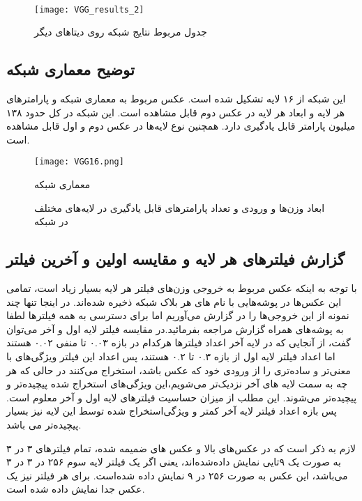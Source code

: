 \documentclass{article}
\begin{document}
‌\begin{figure}[H]
	\centerline{\texttt{[image: VGG\_results\_2]}}
	\caption{جدول مربوط نتایج شبکه  روی دیتاهای دیگر}
\end{figure}
\subsection{توضیح معماری شبکه }
این شبکه از ۱۶ لایه تشکیل شده است. عکس مربوط به معماری شبکه و پارامتر‌های هر لایه و ابعاد هر لایه در عکس دوم قابل مشاهده است. این شبکه در کل حدود ۱۳۸ میلیون 
پارامتر قابل یادگیری دارد. همچنین نوع لایه‌ها در عکس دوم و اول قابل مشاهده است.
\begin{figure}[H]
	\centerline{\texttt{[image: VGG16.png]}}
	\caption{معماری شبکه }
\end{figure}
\begin{figure}[H]
	\centering
	\caption {ابعاد وزن‌ها و ورودی و تعداد پارامتر‌های قابل یادگیری در لایه‌های مختلف در شبکه }
\end{figure}
\subsection{گزارش فیلتر‌های هر لایه و مقایسه اولین و آخرین فیلتر}
با توجه به اینکه عکس مربوط به خروجی وزن‌های فیلتر هر لایه بسیار زیاد است، تمامی این عکس‌ها در پوشه‌هایی با نام های هر بلاک شبکه  ذخیره شده‌اند. در اینجا تنها چند نمونه از این خروجی‌ها را در گزارش می‌آوریم اما برای دسترسی به همه فیلتر‌ها لطفا به پوشه‌های همراه گزارش مراجعه بفرمائید.در مقایسه فیلتر لایه اول و آخر می‌توان گفت، از آنجایی که در لایه آخر اعداد فیلتر‌ها هرکدام در بازه ۰.۰۳ تا منفی ۰.۰۲ هستند اما اعداد فیلتر لایه اول از بازه ۰.۳ تا ۰.۲ هستند، پس اعداد این فیلتر ویژگی‌های با معنی‌تر و ساده‌تری را از ورودی خود که عکس باشد، استخراج می‌کنند در حالی که هر چه به سمت لایه های آخر نزدیک‌تر می‌شویم،‌این ویژگی‌های استخراج شده پیچیده‌تر و پیچیده‌تر می‌شوند. این مطلب از میزان حساسیت فیلترهای لایه اول و آخر معلوم است. پس بازه اعداد فیلتر لایه آخر کمتر و ويژگی‌استخراج شده توسط این لایه نیز بسیار پیچیده‌تر می باشد. 

لازم به ذکر است که در عکس‌های بالا و عکس های ضمیمه شده، تمام فیلتر‌های ۳ در ۳ به صورت یک ۹تایی نمایش داده‌شده‌اند، یعنی اگر یک فیلتر لایه سوم ۲۵۶ در ۳ در ۳ می‌باشد، این عکس به صورت ۲۵۶ در ۹ نمایش داده شده‌است. برای هر فیلتر نیز یک عکس جدا نمایش داده شده است.
\end{document}
